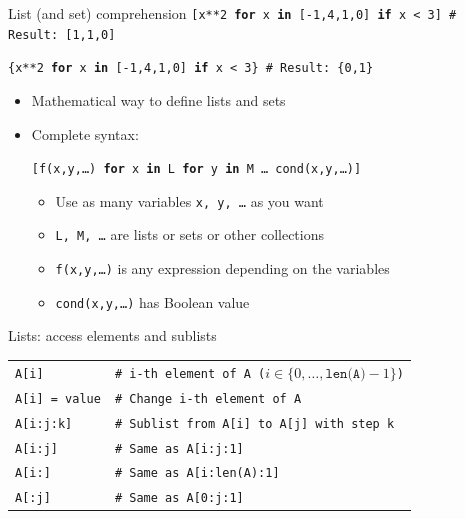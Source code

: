 \documentclass[11pt]{beamer}
\begin{document}
\begin{frame}{List (and set) comprehension}
  \texttt{[x**2 {\bf for} x {\bf in} [-1,4,1,0] {\bf if} x < 3]
          \quad\# Result: [1,1,0]}

  \texttt{\{x**2 {\bf for} x {\bf in} [-1,4,1,0] {\bf if} x < 3\}
          \quad\# Result: \{0,1\}}

  \vspace{0.3cm}
  \begin{itemize}
    \item Mathematical way to define lists and sets
    \item Complete syntax:

          \vspace{0.2cm}
          \texttt{[f(x,y,\dots) {\bf for} x {\bf in} L {\bf for} y {\bf in} M
                   \dots {} cond(x,y,\dots)]}

          \vspace{0.2cm}
          \begin{itemize}
            \item Use as many variables \texttt{x, y, \dots} as you want
            \item \texttt{L, M, \dots} are lists or sets or other collections
            \item \texttt{f(x,y,\dots)} is any expression depending on the
                  variables
            \item \texttt{cond(x,y,\dots)} has Boolean value
          \end{itemize}
  \end{itemize}
\end{frame}

\begin{frame}{Lists: access elements and sublists}
  \begin{tabular}{ll}
    \texttt{A[i]} &
    \texttt{\# i-th element of A ($i\in \{0,\dots,\texttt{len(A)}-1\}$)} \\
    \texttt{A[i] = value} & \texttt{\# Change i-th element of A} \\
    \texttt{A[i:j:k]} & \texttt{\# Sublist from A[i] to A[j] with step k} \\
    \texttt{A[i:j]} & \texttt{\# Same as A[i:j:1]} \\
    \texttt{A[i:]} & \texttt{\# Same as A[i:len(A):1]} \\
    \texttt{A[:j]} & \texttt{\# Same as A[0:j:1]}
  \end{tabular}
\end{frame}
\end{document}

